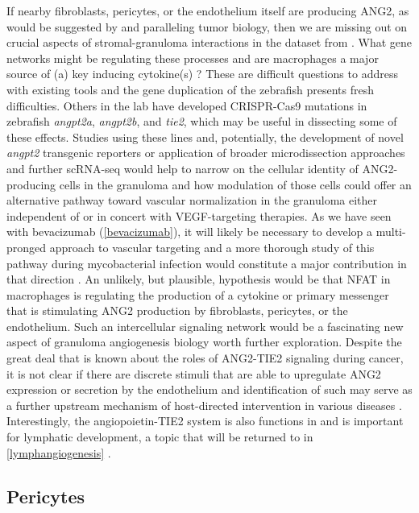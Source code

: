 If nearby fibroblasts, pericytes, or the endothelium itself are producing ANG2, as would be suggested by \citet{Gideon2022} and paralleling tumor biology, then we are missing out on crucial aspects of stromal\hyp{}granuloma interactions in the dataset from \citet{Cronan2021}. What gene networks might be regulating these processes and are macrophages a major source of (a) key inducing cytokine(s) \citep{Augustin2009}? These are difficult questions to address with existing tools and the gene duplication of the zebrafish presents fresh difficulties. Others in the lab have developed CRISPR\hyp{}Cas9 mutations in zebrafish \textit{angpt2a}, \textit{angpt2b}, and \textit{tie2}, which may be useful in dissecting some of these effects. Studies using these lines and, potentially, the development of novel \textit{angpt2} transgenic reporters or application of broader microdissection approaches and further scRNA\hyp{}seq would help to narrow on the cellular identity of ANG2\hyp{}producing cells in the granuloma and how modulation of those cells could offer an alternative pathway toward vascular normalization in the granuloma either independent of or in concert with VEGF\hyp{}targeting therapies. As we have seen with bevacizumab (\autoref{bevacizumab}), it will likely be necessary to develop a multi\hyp{}pronged approach to vascular targeting and a more thorough study of this pathway during mycobacterial infection would constitute a major contribution in that direction \citep{Huang2010, Saharinen2017}. An unlikely, but plausible, hypothesis would be that NFAT in macrophages is regulating the production of a cytokine or primary messenger that is stimulating ANG2 production by fibroblasts, pericytes, or the endothelium. Such an intercellular signaling network would be a fascinating new aspect of granuloma angiogenesis biology worth further exploration. Despite the great deal that is known about the roles of ANG2\hyp{}TIE2 signaling during cancer, it is not clear if there are discrete stimuli that are able to upregulate ANG2 expression or secretion by the endothelium and identification of such may serve as a further upstream mechanism of host\hyp{}directed intervention in various diseases \citep{Huang2010}. Interestingly, the angiopoietin\hyp{}TIE2 system is also functions in and is important for lymphatic development, a topic that will be returned to in \autoref{lymphangiogenesis} \citep{Eklund2017}.

\subsection{Pericytes}\label{pericytes}

